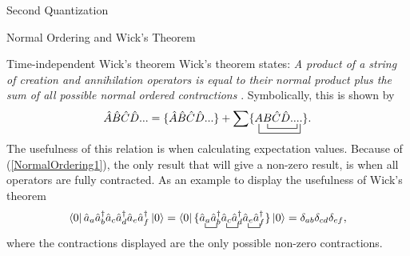 \documentclass[twoside,english]{uiofysmaster}
\begin{document}
\begin{chapter}{Second Quantization}
\begin{section}{Normal Ordering and Wick's Theorem}
		\begin{subsection}{Time-independent Wick's theorem}
			Wick's theorem states: \textit{A product of a string of creation and annihilation operators is equal to their normal product plus the sum of all possible normal ordered contractions} \cite{ShavittAndBartlett}. Symbolically, this is shown by 
			\begin{align}
				\hat A \hat B \hat C \hat D ... = \{\hat A \hat B \hat C \hat D ... \} + \sum \{  \bcontraction[2ex]{}{\hat A}{\hat B \hat C \hat D ...}
				\hat A \bcontraction{}{\hat B}{\hat C \hat D ..}
				\hat B \hat C \hat D .... \}.
			\end{align}
			The usefulness of this relation is when calculating expectation values. Because of (\ref{NormalOrdering1}), the only result that will give a non-zero result, is when all operators are fully contracted. As an example to display the usefulness of Wick's theorem 
			\begin{align}
				\left< 0 \right| \hat a_a \hat a_b^\dagger \hat a_c \hat a_d^\dagger \hat a_e \hat a_f^\dagger \left| 0 \right> = \left< 0 \right| \{ 
				\bcontraction{}{\hat a_a}{}{\hat a_b^\dagger}
				\hat a_a \hat a_b^\dagger \bcontraction{}{\hat a_c}{}{\hat a_d^\dagger}
				\hat a_c \hat a_d^\dagger \bcontraction{}{\hat a_e}{}{\hat a_f^\dagger}
				\hat a_e \hat a_f^\dagger 
				\} \left| 0 \right> = \delta_{ab} \delta_{cd} \delta_{ef},
			\end{align}
			where the contractions displayed are the only possible non-zero contractions.
		\end{subsection}
	\end{section}


\end{chapter}
\end{document}
